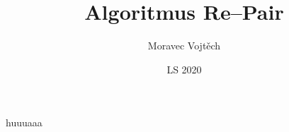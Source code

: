 \documentclass[a4paper,12pt]{article}
\author{Moravec Vojtěch}
\title{Algoritmus Re--Pair}
\date{LS 2020}
\begin{document}
\maketitle
\newpage
\tableofcontents
\newpage

huuuaaa



\end{document}
